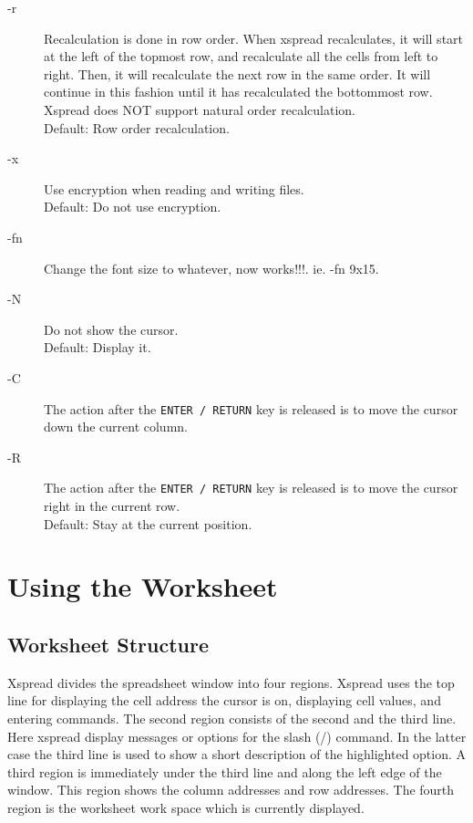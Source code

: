 \begin{description}
\item[-r]{Recalculation is done in row order.  When xspread recalculates, 
  it will start at the left of the topmost row, and recalculate all the 
  cells from left to right.  Then, it will recalculate the next row in 
  the same order.  It will continue in this fashion until it has 
  recalculated the bottommost row.\\
  Xspread does NOT support natural order recalculation.\\
  Default:  Row order recalculation.}

\item[-x]{  Use encryption when reading and writing files.\\
    Default:  Do not use encryption.}

\item[-fn]{ Change the font size to whatever, now works!!!. ie. -fn 9x15.}

\item[-N]{ Do not show the cursor.\\
    Default:  Display it.}

\item[-C]{ The action after the {\tt ENTER / RETURN} key is released is
  to move the cursor down the current column.}

\item[-R]{ The action after the {\tt ENTER / RETURN} key is released is
  to move the cursor right in the current row.\\
    Default:  Stay at the current position.}
\end{description}

\newpage
\section*{Using the Worksheet}

\subsection*{Worksheet Structure}

    Xspread divides the spreadsheet window into four regions.  Xspread uses 
the top line for displaying the cell address the cursor is on, displaying cell 
values, and entering commands.
The second region consists of the second and the third line. Here xspread
display messages or options for the slash (/) command. In the latter case
the third line is used to show a short description of the highlighted
option.
A third region is immediately under the third line and along the left edge
of the window.  This region shows the column addresses and row addresses.
The fourth region is the worksheet work space which is currently displayed.

